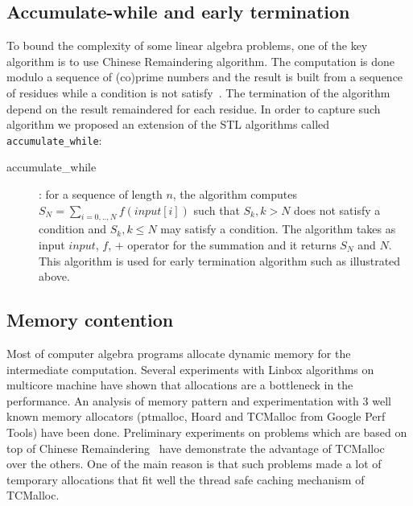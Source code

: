 \documentclass[runningheads,a4paper]{llncs}
\begin{document}
\subsection{Accumulate-while and early termination}
  To bound the complexity of some linear algebra problems,  one of the key algorithm is to use Chinese Remaindering algorithm. The computation is done modulo a sequence of (co)prime numbers and the result is built from a sequence of residues while a condition is not satisfy~\cite{jgd:2010:crt}. The termination of the algorithm depend on the result remaindered for each residue. 
  In order to capture such algorithm we proposed an extension of the STL algorithms called \verb+accumulate_while+:
\begin{description} 
\item [accumulate\_while]: for a sequence of length $n$, the algorithm computes $S_N = \sum_{i=0,..,N} f(input[i])$ such that $S_k, k>N$ does not satisfy a condition and  $S_k, k \leq N$ may satisfy a condition. The algorithm takes as input $input$, $f$, $+$ operator for the summation and it returns $S_N$ and $N$. This algorithm is used for early termination algorithm such as illustrated above.
\end{description} 



\subsection{Memory contention}
Most of computer algebra programs allocate dynamic memory for the intermediate computation.
Several experiments with Linbox algorithms on multicore machine have shown that allocations are a bottleneck in the performance. 
  An analysis of memory pattern and experimentation with 3 well known memory allocators  (ptmalloc, Hoard and TCMalloc from Google Perf Tools) have been done. Preliminary experiments on problems which are based on top of Chinese Remaindering~\cite{jgd:2010:crt} have demonstrate the advantage of TCMalloc~\cite{tcmalloc} over the others. 
  One of the main reason is that such problems made a lot of temporary allocations that fit well the thread safe caching mechanism of TCMalloc.
\end{document}
